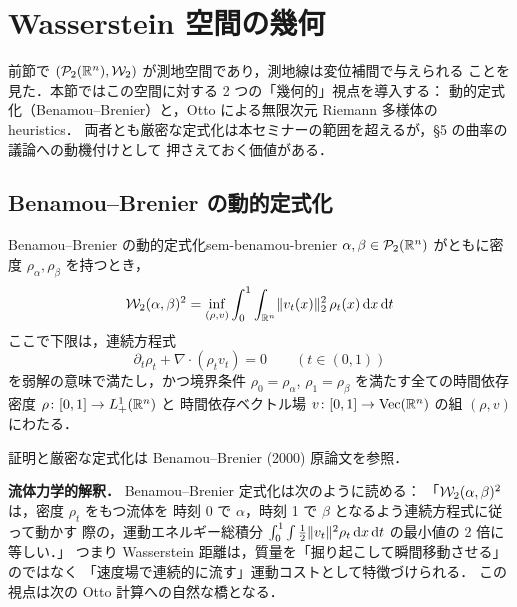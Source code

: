 \section{Wasserstein 空間の幾何}
\label{sec:sem-otto}

前節で $(\mathcal{P}_2(\mathbb{R}^n), \mathcal{W}_2)$ が測地空間であり，測地線は変位補間で与えられる
ことを見た．本節ではこの空間に対する 2 つの「幾何的」視点を導入する：
動的定式化（Benamou--Brenier）と，Otto による無限次元 Riemann 多様体の heuristics．
両者とも厳密な定式化は本セミナーの範囲を超えるが，§5 の曲率の議論への動機付けとして
押さえておく価値がある．

\subsection{Benamou--Brenier の動的定式化}

\begin{proposition}{Benamou--Brenier の動的定式化}{sem-benamou-brenier}
  $\alpha, \beta \in \mathcal{P}_2(\mathbb{R}^n)$ がともに密度 $\rho_\alpha, \rho_\beta$ を持つとき，
  \[
    \mathcal{W}_2(\alpha, \beta)^2
    = \inf_{(\rho, v)}
    \int_0^1 \int_{\mathbb{R}^n} \lVert v_t(x) \rVert_2^2 \, \rho_t(x) \, \mathrm{d} x \, \mathrm{d} t
  \]
  ここで下限は，連続方程式
  \[
    \partial_t \rho_t + \nabla \cdot (\rho_t v_t) = 0
    \qquad (t \in (0, 1))
  \]
  を弱解の意味で満たし，かつ境界条件 $\rho_0 = \rho_\alpha$, $\rho_1 = \rho_\beta$
  を満たす全ての時間依存密度 $\rho \colon [0, 1] \to L^1_+(\mathbb{R}^n)$ と
  時間依存ベクトル場 $v \colon [0, 1] \to \mathrm{Vec}(\mathbb{R}^n)$ の組 $(\rho, v)$
  にわたる．
\end{proposition}

証明と厳密な定式化は Benamou--Brenier (2000) 原論文を参照．

\begin{memo*}
  \textbf{流体力学的解釈．}
  Benamou--Brenier 定式化は次のように読める：
  「$\mathcal{W}_2(\alpha, \beta)^2$ は，密度 $\rho_t$ をもつ流体を
  時刻 0 で $\alpha$，時刻 1 で $\beta$ となるよう連続方程式に従って動かす
  際の，運動エネルギー総積分
  $\int_0^1 \int \frac{1}{2} \lVert v_t \rVert^2 \rho_t \, \mathrm{d} x \, \mathrm{d} t$ の最小値の
  2 倍に等しい．」
  つまり Wasserstein 距離は，質量を「掘り起こして瞬間移動させる」のではなく
  「速度場で連続的に流す」運動コストとして特徴づけられる．
  この視点は次の Otto 計算への自然な橋となる．
\end{memo*}

